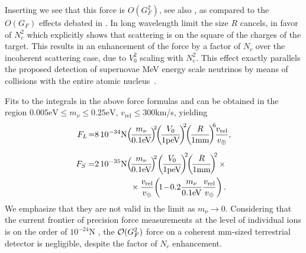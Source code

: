 Inserting  we see that this force is $O(G_F^2)$, see also \cite{Shvartsman,Smith,Gelmini}, as compared to the $O(G_F)$ effects debated in  \cite{Opher:1974drq,Lewis,Opher2,Cabibbo:1982,Langacker:1982,Smith,Ferreras:1995wf}. In long wavelength limit the size $R$ cancels, in favor of $N_c^2$ which explicitly shows that scattering is on the square of the charges of the target. This results in an enhancement of the force by a factor of $N_c$ over the incoherent scattering case, due to $V_0^2$ scaling with $N_c^2$. This effect exactly parallels the proposed detection of supernovae MeV energy scale neutrinos by means of collisions with the entire atomic nucleus~\cite{Divari:2012zz}.  




Fits to the integrals in the above force formulas  and  can be obtained in the region $0.005 \text{eV}\leq m_\nu\leq 0.25\text{eV}$, $v_\text{rel}\leq 300$km/s, yielding
\begin{align}\label{F_L}
F_L\!=&8\,10^{-34}{\rm N}\!\left(\!\frac{m_\nu}{0.1 \text{eV}}\!\right)^{\!\!2}\!\! \left(\!\frac{V_0}{1\text{peV}}\!\right)^{\!\!2}\!\!\left(\!\frac{R}{1\text{mm}}\!\right)^{\!\! 6} \!\!\frac{v_{\text{rel}}}{v_\oplus},\\[0.2cm]
F_S=&2\, 10^{-35}{\rm N}\!\left(\!\frac{m_\nu}{0.1\text{eV}}\!\right)^{\!\!2}\! \left(\!\frac{V_0}{1\text{peV}}\!\right)^{\!\!2}\!\!\left(\!\frac{R}{1\text{mm}}\!\right)^{\!\!2}\times\notag \\
&\hspace*{1.5cm}\times\frac{v_{\text{rel}}}{v_\oplus}\!\left(\!1\!-\!0.2\frac{m_\nu}{0.1\text{eV}}\frac{v_{\text{rel}}}{v_\oplus}\right).
\end{align}
We emphasize that they are not valid in the limit as $m_\nu\rightarrow 0$. Considering that the current frontier of precision force measurements at the level of individual ions is on the order of $10^{-24}$N \cite{Biercuk}, the ${\cal O}(G_F^2)$ force on a coherent mm-sized terrestrial detector is negligible, despite the factor of $N_c$ enhancement. 


